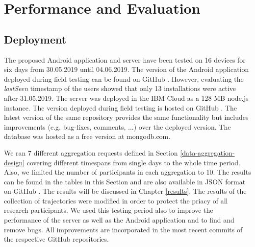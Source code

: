 \chapter{Performance and Evaluation}\label{chapter:performance}
\section{Deployment}\label{deployment}
The proposed Android application and server have been tested on 16 devices for six days from 30.05.2019 until 04.06.2019. The version of the Android application deployed during field testing can be found on GitHub \parencite{final-version-app}. However, evaluating the \textit{lastSeen} timestamp of the users showed that only 13 installations were active after 31.05.2019. The server was deployed in the IBM Cloud as a 128 MB node.js instance. The version deployed during field testing is hosted on GitHub \parencite{final-version-server}. The latest version of the same repository provides the same functionality but includes improvements (e.g. bug-fixes, comments, ...) over the deployed version. The database was hosted as a free version at mongodb.com.

We ran 7 different aggregation requests defined in Section \ref{data-aggregation-design} covering different timespans from single days to the whole time period. Also, we limited the number of participants in each aggregation to 10. The results can be found in the tables in this Section and are also available in JSON format on GitHub \parencite{github-results}. The results will be discussed in Chapter \ref{results}. The results of the collection of trajectories were modified in order to protect the priacy of all research participants. We used this testing period also to improve the performance of the server as well as the Android application and to find and remove bugs. All improvements are incorporated in the most recent commits of the respective GitHub repositories.

